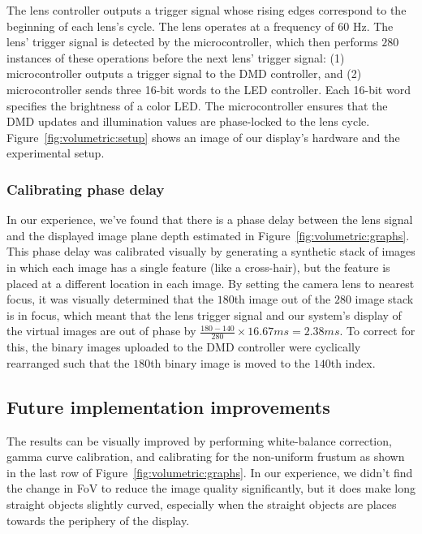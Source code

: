 The lens controller outputs a trigger signal whose rising edges correspond to the beginning of each lens's cycle. The lens operates at a frequency of 60 Hz. The lens' trigger signal is detected by the microcontroller, which then performs $280$ instances of these operations before the next lens' trigger signal: (1) microcontroller outputs a trigger signal to the DMD controller, and (2) microcontroller sends three 16-bit words to the LED controller. Each 16-bit word specifies the brightness of a color LED. The microcontroller ensures that the DMD updates and illumination values are phase-locked to the lens cycle. Figure~\ref{fig:volumetric:setup} shows an image of our display's hardware and the experimental setup. 

\subsubsection{Calibrating phase delay}
In our experience, we've found that there is a phase delay between the lens signal and the displayed image plane depth estimated in Figure~\ref{fig:volumetric:graphs}. This phase delay was calibrated visually by generating a synthetic stack of images in which each image has a single feature (like a cross-hair), but the feature is placed at a different location in each image. By setting the camera lens to nearest focus, it was visually determined that the $180$th image out of the $280$ image stack is in focus, which meant that the lens trigger signal and our system's display of the virtual images are out of phase by $\frac{180 - 140}{280} \times 16.67ms = 2.38 ms$. To correct for this, the binary images uploaded to the DMD controller were cyclically rearranged such that the $180$th binary image is moved to the $140$th index.

\subsection{Future implementation improvements}
The results can be visually improved by performing white-balance correction, gamma curve calibration, and calibrating for the non-uniform frustum as shown in the last row of Figure~\ref{fig:volumetric:graphs}. In our experience, we didn't find the change in FoV to reduce the image quality significantly, but it does make long straight objects slightly curved, especially when the straight objects are places towards the periphery of the display. 
